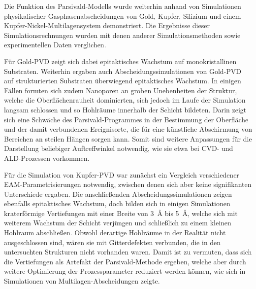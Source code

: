 
Die Funktion des Parsivald-Modells wurde weiterhin anhand von Simulationen physikalischer Gasphasenabscheidungen von Gold, Kupfer, Silizium und einem Kupfer-Nickel-Multilagensystem demonstriert.
Die Ergebnisse dieser Simulationsrechnungen wurden mit denen anderer Simulationsmethoden sowie experimentellen Daten verglichen.

Für Gold-PVD zeigt sich dabei epitaktisches Wachstum auf monokristallinen Substraten.
Weiterhin ergaben auch Abscheidungssimulationen von Gold-PVD auf strukturierten Substraten überwiegend epitaktisches Wachstum.
In einigen Fällen formten sich zudem Nanoporen an groben Unebenheiten der Struktur, welche die Oberflächenrauheit dominierten, sich jedoch im Laufe der Simulation langsam schlossen und so Hohlräume innerhalb der Schicht bildeten.
Darin zeigt sich eine Schwäche des Parsivald-Programmes in der Bestimmung der Oberfläche und der damit verbundenen Ereignisorte, die für eine künstliche Abschirmung von Bereichen an steilen Hängen sorgen kann.
Somit sind weitere Anpassungen für die Darstellung beliebiger Auftreffwinkel notwendig, wie sie etwa bei CVD- und ALD-Prozessen vorkommen.

Für die Simulation von Kupfer-PVD war zunächst ein Vergleich verschiedener EAM-Para\-metri\-sierungen notwendig, zwischen denen sich aber keine signifikanten Unterschiede ergaben.
Die anschließenden Abscheidungssimulationen zeigen ebenfalls epitaktisches Wachstum, doch bilden sich in einigen Simulationen kraterförmige Vertiefungen mit einer Breite von \SI{3}{\angstrom} bis \SI{5}{\angstrom}, welche sich mit weiterem Wachstum der Schicht verjüngen und schließlich zu einem kleinen Hohlraum abschließen.
Obwohl derartige Hohlräume in der Realität nicht ausgeschlossen sind, wären sie mit Gitterdefekten verbunden, die in den untersuchten Strukturen nicht vorhanden waren.
Damit ist zu vermuten, dass sich die Vertiefungen als Artefakt der Parsivald-Methode ergeben, welche aber durch weitere Optimierung der Prozessparameter reduziert werden können, wie sich in Simulationen von Multilagen-Abscheidungen zeigte.


